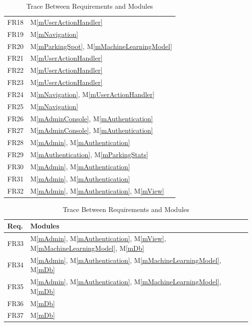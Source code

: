\documentclass[12pt, titlepage]{article}
\newcommand{\mref}[1]{M\ref{#1}}
\begin{document}
\begin{table}[H]
\begin{tabular}{p{} p{}}
FR18 & \mref{mUserActionHandler}\\
FR19 & \mref{mNavigation}\\
FR20 & \mref{mParkingSpot}, \mref{mMachineLearningModel}\\
FR21 & \mref{mUserActionHandler}\\
FR22 & \mref{mUserActionHandler}\\
FR23 & \mref{mUserActionHandler}\\
FR24 & \mref{mNavigation}, \mref{mUserActionHandler}\\
FR25 & \mref{mNavigation}\\
FR26 & \mref{mAdminConsole}, \mref{mAuthentication}\\
FR27 & \mref{mAdminConsole}, \mref{mAuthentication}\\
FR28 & \mref{mAdmin}, \mref{mAuthentication}\\
FR29 & \mref{mAuthentication}, \mref{mParkingStats}\\
FR30 & \mref{mAdmin}, \mref{mAuthentication}\\
FR31 & \mref{mAdmin}, \mref{mAuthentication}\\
FR32 & \mref{mAdmin}, \mref{mAuthentication}, \mref{mView} \\
\bottomrule
\end{tabular}
\caption{Trace Between Requirements and Modules}
\label{TblRT}
\end{table}

\newpage
\begin{table}[H]
\centering
\begin{tabular}{p{} p{}}
\toprule
\textbf{Req.} & \textbf{Modules}\\
\midrule
FR33 & \mref{mAdmin}, \mref{mAuthentication}, \mref{mView},
\mref{mMachineLearningModel}, \mref{mDb}\\
FR34 & \mref{mAdmin}, \mref{mAuthentication}, \mref{mMachineLearningModel},
\mref{mDb}\\
FR35 & \mref{mAdmin}, \mref{mAuthentication}, \mref{mMachineLearningModel},
\mref{mDb}\\
FR36 & \mref{mDb}\\
FR37 & \mref{mDb}\\

\bottomrule
\end{tabular}
\caption{Trace Between Requirements and Modules}
\label{TblRT}
\end{table}
\end{document}
